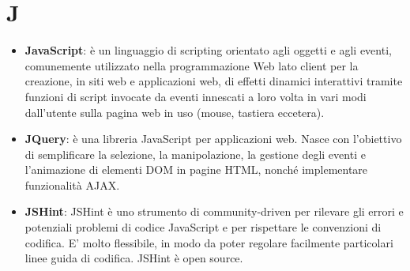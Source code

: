 \section{J}
\begin{itemize} 
	\item
	\textbf{JavaScript}: è un linguaggio di scripting orientato agli oggetti e agli eventi, comunemente utilizzato nella programmazione Web lato client per la creazione, in siti web e applicazioni web, di effetti dinamici interattivi tramite funzioni di script invocate da eventi innescati a loro volta in vari modi dall'utente sulla pagina web in uso (mouse, tastiera eccetera).
	\item
	\textbf{JQuery}: è una libreria JavaScript per applicazioni web. Nasce con l'obiettivo di semplificare la selezione, la manipolazione, la gestione degli eventi e l'animazione di elementi DOM in pagine HTML, nonché implementare funzionalità AJAX.
	\item
	\textbf{JSHint}: JSHint è uno strumento di community-driven per rilevare gli errori e potenziali problemi di codice JavaScript e per rispettare le convenzioni di codifica. E' molto flessibile, in modo da poter regolare facilmente particolari linee guida di codifica. JSHint è open source.
\end{itemize}
